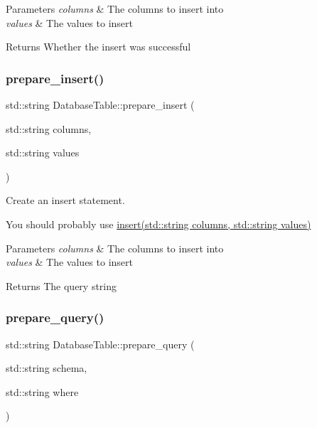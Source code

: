 \begin{DoxyParams}{Parameters}
{\em columns} & The columns to insert into \\
\hline
{\em values} & The values to insert \\
\hline
\end{DoxyParams}
\begin{DoxyReturn}{Returns}
Whether the insert was successful 
\end{DoxyReturn}
\mbox{\label{class_database_table_a6fce977a2f3583c2514807e5bec7ccd3}} 
\subsubsection{\texorpdfstring{prepare\+\_\+insert()}{prepare\_insert()}}
{\footnotesize\ttfamily std\+::string Database\+Table\+::prepare\+\_\+insert (\begin{DoxyParamCaption}\item[{std\+::string}]{columns,  }\item[{std\+::string}]{values }\end{DoxyParamCaption})}



Create an insert statement. 

You should probably use \hyperlink{class_database_table_a91151267d595dd3b6b1f78f0919fd4e5}{insert(std\+::string columns, std\+::string values)}


\begin{DoxyParams}{Parameters}
{\em columns} & The columns to insert into \\
\hline
{\em values} & The values to insert \\
\hline
\end{DoxyParams}
\begin{DoxyReturn}{Returns}
The query string 
\end{DoxyReturn}
\mbox{\label{class_database_table_afcae3a4f668aa7b6808870d6cc1abd81}} 
\subsubsection{\texorpdfstring{prepare\+\_\+query()}{prepare\_query()}\hspace{0.1cm}{\footnotesize\ttfamily [1/2]}}
{\footnotesize\ttfamily std\+::string Database\+Table\+::prepare\+\_\+query (\begin{DoxyParamCaption}\item[{std\+::string}]{schema,  }\item[{std\+::string}]{where }\end{DoxyParamCaption})}




